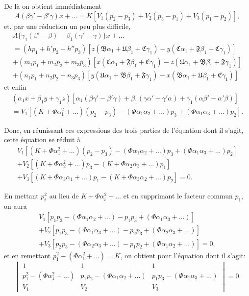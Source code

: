 \documentclass[11pt,a4paper]{book}
\begin{document}
De l\`{a} on obtient imm\'{e}diatement
\[
A(\beta\gamma' - \beta'\gamma)x + \ldots = K[V_1(p_2 - p_3) + V_2(p_3 - p_1) + V_3(p_1 - p_2)],
\]
et, par une r\'{e}duction un peu plus difficile,
\begin{multline*}
A\{\gamma_1(\beta' - \beta) - \beta_1(\gamma' - \gamma)\}x + \ldots \\
= (hp_1 + h'p_2 + h''p_3)[z(\mathfrak{B}\alpha_1 + \mathfrak{U}\beta_1 + \mathfrak{C}\gamma_1) - y(\mathfrak{C}\alpha_1 + \mathfrak{F}\beta_1 + \mathfrak{C}\gamma_1)] \\
+ (m_1 p_1 + m_2 p_2 + m_3 p_3)[x(\mathfrak{C}\alpha_1 + \mathfrak{F}\beta_1 + \mathfrak{C}\gamma_1) - z(\mathfrak{U}\alpha_1 + \mathfrak{B}\beta_1 + \mathfrak{F}\gamma_1)] \\
+ (n_1 p_1 + n_2 p_2 + n_3 p_3)[y(\mathfrak{U}\alpha_1 + \mathfrak{B}\beta_1 + \mathfrak{F}\gamma_1) - x(\mathfrak{B}\alpha_1 + \mathfrak{U}\beta_1 + \mathfrak{C}\gamma_1)]
\end{multline*}
et enfin
\begin{multline*}
(\alpha_1 x + \beta_1 y + \gamma_1 z)[\alpha_1(\beta\gamma' - \beta'\gamma) + \beta_1(\gamma\alpha' - \gamma'\alpha) + \gamma_1(\alpha\beta' - \alpha'\beta)] \\
= V_1[(K + \Phi\alpha_1^2 + \ldots)(p_2 - p_3) - (\Phi\alpha_1\alpha_2 + \ldots)p_3 + (\Phi\alpha_1\alpha_3 + \ldots)p_2].
\end{multline*}

Donc, en r\'{e}unissant ces expressions des trois parties de l'\'{e}quation dont il s'agit, cette \'{e}quation se r\'{e}duit \`{a}
\begin{multline}\tag{24}
V_1[(K + \Phi\alpha_1^2 + \ldots)(p_2 - p_3) - (\Phi\alpha_1\alpha_2 + \ldots)p_3 + (\Phi\alpha_1\alpha_3 + \ldots)p_2] \\
+ V_2[(K + \Phi\alpha_2^2 + \ldots)p_3 - (K + \Phi\alpha_2\alpha_3 + \ldots)p_1] \\
+ V_3[(K + \Phi\alpha_3\alpha_1 + \ldots)p_1 - (K + \Phi\alpha_3\alpha_2 + \ldots)p_2] = 0.
\end{multline}

En mettant $p_i^2$ au lieu de $K + \Phi\alpha_i^2 + \ldots$ et en supprimant le facteur commun $p_1$, on aura
\begin{multline*}
V_1[p_1 p_2 - (\Phi\alpha_1\alpha_2 + \ldots) - p_1 p_3 + (\Phi\alpha_1\alpha_3 + \ldots)] \\
+ V_2[p_1 p_3 - (\Phi\alpha_1\alpha_3 + \ldots) - p_2 p_3 + (\Phi\alpha_2\alpha_3 + \ldots)] \\
+ V_3[p_2 p_3 - (\Phi\alpha_2\alpha_3 + \ldots) - p_1 p_2 + (\Phi\alpha_1\alpha_2 + \ldots)] = 0,
\end{multline*}
et en remettant $p_1^2 - (\Phi\alpha_1^2 + \ldots) = K$, on obtient pour l'\'{e}quation dont il s'agit:
\begin{equation}\tag{25}
\begin{vmatrix}
1 & 1 & 1 \\
p_1^2 - (\Phi\alpha_1^2 + \ldots) & p_1 p_2 - (\Phi\alpha_1\alpha_2 + \ldots) & p_1 p_3 - (\Phi\alpha_1\alpha_3 + \ldots) \\
V_1 & V_2 & V_3
\end{vmatrix} = 0.
\end{equation}
\end{document}
